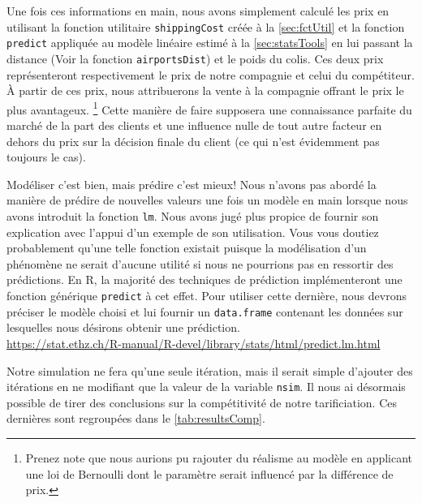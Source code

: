 Une fois ces informations en main, nous avons simplement calculé les prix en utilisant la fonction utilitaire \texttt{shippingCost} créée à la \autoref{sec:fctUtil} et la fonction \texttt{predict} appliquée au modèle linéaire estimé à la \autoref{sec:statsTools} en lui passant la distance (Voir la fonction \texttt{airportsDist}) et le poids du colis. Ces deux prix représenteront respectivement le prix de notre compagnie et celui du compétiteur. À partir de ces prix, nous attribuerons la vente à la compagnie offrant le prix le plus avantageux. \footnote{Prenez note que nous aurions pu rajouter du réalisme au modèle en applicant une loi de Bernoulli dont le paramètre serait influencé par la différence de prix.} Cette manière de faire supposera une connaissance parfaite du marché de la part des clients et une influence nulle de tout autre facteur en dehors du prix sur la décision finale du client (ce qui n'est évidemment pas toujours le cas). \\

\begin{moreInfo}{Modéliser c'est bien, mais prédire c'est mieux!}
	Nous n'avons pas abordé la manière de prédire de nouvelles valeurs une fois un modèle en main lorsque nous avons introduit la fonction \texttt{lm}. Nous avons jugé plus propice de fournir son explication avec l'appui d'un exemple de son utilisation. Vous vous doutiez probablement qu'une telle fonction existait puisque la modélisation d'un phénomène ne serait d'aucune utilité si nous ne pourrions pas en ressortir des prédictions. En R, la majorité des techniques de prédiction implémenteront une fonction générique \texttt{predict} à cet effet. Pour utiliser cette dernière, nous devrons préciser le modèle choisi et lui fournir un \texttt{data.frame} contenant les données sur lesquelles nous désirons obtenir une prédiction. \\
	\url{https://stat.ethz.ch/R-manual/R-devel/library/stats/html/predict.lm.html}
\end{moreInfo}

Notre simulation ne fera qu'une seule itération, mais il serait simple d'ajouter des itérations en ne modifiant que la valeur de la variable \texttt{nsim}. Il nous ai désormais possible de tirer des conclusions sur la compétitivité de notre tarificiation. Ces dernières sont regroupées dans le \autoref{tab:resultsComp}. \\


